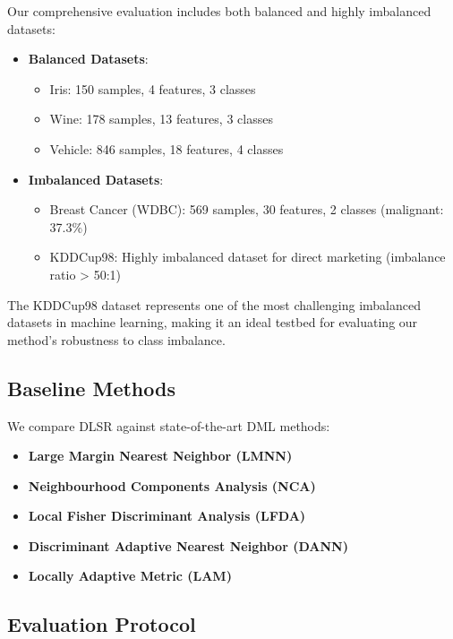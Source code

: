 \documentclass[review]{elsarticle}
\begin{document}
Our comprehensive evaluation includes both balanced and highly imbalanced datasets:

\begin{itemize}
\item \textbf{Balanced Datasets}:
  \begin{itemize}
  \item Iris: 150 samples, 4 features, 3 classes
  \item Wine: 178 samples, 13 features, 3 classes  
  \item Vehicle: 846 samples, 18 features, 4 classes
  \end{itemize}

\item \textbf{Imbalanced Datasets}:
  \begin{itemize}
  \item Breast Cancer (WDBC): 569 samples, 30 features, 2 classes (malignant: 37.3\%)
  \item KDDCup98: Highly imbalanced dataset for direct marketing (imbalance ratio > 50:1)
  \end{itemize}
\end{itemize}

The KDDCup98 dataset represents one of the most challenging imbalanced datasets in machine learning, making it an ideal testbed for evaluating our method's robustness to class imbalance.

\subsection{Baseline Methods}

We compare DLSR against state-of-the-art DML methods:

\begin{itemize}
\item \textbf{Large Margin Nearest Neighbor (LMNN)}~\cite{weinberger2009distance}
\item \textbf{Neighbourhood Components Analysis (NCA)}~\cite{goldberger2005neighbourhood}
\item \textbf{Local Fisher Discriminant Analysis (LFDA)}~\cite{sugiyama2007dimensionality}
\item \textbf{Discriminant Adaptive Nearest Neighbor (DANN)}~\cite{hastie1996discriminant}
\item \textbf{Locally Adaptive Metric (LAM)}~\cite{domeniconi2002locally}
\end{itemize}

\subsection{Evaluation Protocol}
\end{document}
